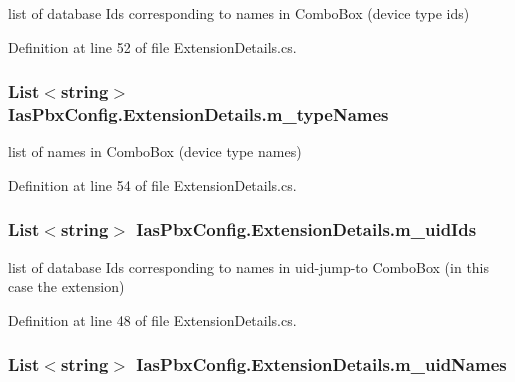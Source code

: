list of database Ids corresponding to names in ComboBox (device type ids) 

Definition at line 52 of file ExtensionDetails.cs.\hypertarget{class_ias_pbx_config_1_1_extension_details_a5bbad0dfeb7beed8ee4ca6da920a60e9}{
\subsubsection[{m\_\-typeNames}]{\setlength{\rightskip}{0pt plus 5cm}List$<$string$>$ {\bf IasPbxConfig.ExtensionDetails.m\_\-typeNames}}}
\label{class_ias_pbx_config_1_1_extension_details_a5bbad0dfeb7beed8ee4ca6da920a60e9}


list of names in ComboBox (device type names) 

Definition at line 54 of file ExtensionDetails.cs.\hypertarget{class_ias_pbx_config_1_1_extension_details_a827f90a12300cda5f44afcd08fc2a854}{
\subsubsection[{m\_\-uidIds}]{\setlength{\rightskip}{0pt plus 5cm}List$<$string$>$ {\bf IasPbxConfig.ExtensionDetails.m\_\-uidIds}}}
\label{class_ias_pbx_config_1_1_extension_details_a827f90a12300cda5f44afcd08fc2a854}


list of database Ids corresponding to names in uid-\/jump-\/to ComboBox (in this case the extension) 

Definition at line 48 of file ExtensionDetails.cs.\hypertarget{class_ias_pbx_config_1_1_extension_details_afe69a712727a96911d8c24927b15b779}{
\subsubsection[{m\_\-uidNames}]{\setlength{\rightskip}{0pt plus 5cm}List$<$string$>$ {\bf IasPbxConfig.ExtensionDetails.m\_\-uidNames}}}
\label{class_ias_pbx_config_1_1_extension_details_afe69a712727a96911d8c24927b15b779}


